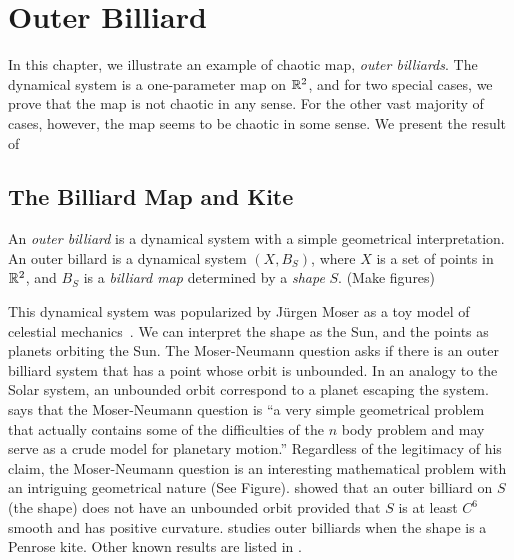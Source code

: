 \documentclass[12pt,twoside,draft]{book}
\begin{document}
\chapter{Outer Billiard}
In this chapter, we illustrate an example of chaotic map, \textit{outer billiards}.
The dynamical system is a one-parameter map on $\mathbb{R}^2$, and for two special cases, we prove that the map is not chaotic in any sense.
For the other vast majority of cases, however, the map seems to be chaotic in some sense.
We present the result of

\section{The Billiard Map and Kite}
An \textit{outer billiard} is a dynamical system with a simple geometrical interpretation.
An outer billard is a dynamical system $(X, B_S)$, where $X$ is a set of points in $\mathbb{R}^2$, and $B_S$ is a \textit{billiard map} determined by a \textit{shape} $S$.
(Make figures)

This dynamical system was popularized by Jürgen Moser as a toy model of celestial mechanics~\citep{moser,moserbook}.
We can interpret the shape as the Sun, and the points as planets orbiting the Sun.
The Moser-Neumann question asks if there is an outer billiard system that has a point whose orbit is unbounded.
In an analogy to the Solar system, an unbounded orbit correspond to a planet escaping the system.
\citet{moser} says that the Moser-Neumann question is
``a very simple geometrical problem that actually contains some of the difficulties of the $n$ body problem and may serve as a crude model for planetary motion.''
Regardless of the legitimacy of his claim, the Moser-Neumann question is an interesting mathematical problem with an intriguing geometrical nature (See Figure).
\citet{moserbook} showed that an outer billiard on $S$ (the shape) does not have an unbounded orbit provided that $S$ is at least $C^6$ smooth and has positive curvature. 
\citet{schwartz} studies outer billiards when the shape is a Penrose kite.
Other known results are listed in \citet[p. 2]{schwartz}.
\end{document}
